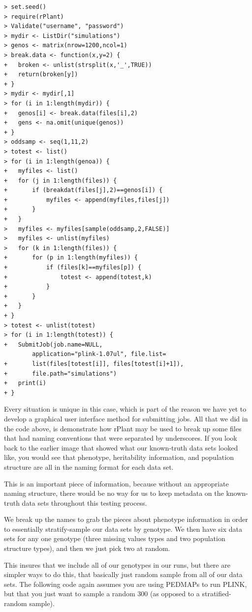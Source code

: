 \documentclass[twoside,a4paper]{refart}
\begin{document}
\begin{center}
\begin{lstlisting}[frame=single]
> set.seed()
> require(rPlant) 
> Validate("username", "password")
> mydir <- ListDir("simulations")
> genos <- matrix(nrow=1200,ncol=1)
> break.data <- function(x,y=2) {
+	broken <- unlist(strsplit(x,'_',TRUE))
+	return(broken[y])
+ }
> mydir <- mydir[,1]
> for (i in 1:length(mydir)) {
+	genos[i] <- break.data(files[i],2) 
+	gens <- na.omit(unique(genos))
+ }
> oddsamp <- seq(1,11,2)
> totest <- list()
> for (i in 1:length(genoa)) {
+	myfiles <- list()
+	for (j in 1:length(files)) {
+		if (breakdat(files[j],2)==genos[i]) {
+			myfiles <- append(myfiles,files[j])
+		}
+	}
>	myfiles <- myfiles[sample(oddsamp,2,FALSE)]
>	myfiles <- unlist(myfiles)
>	for (k in 1:length(files)) {
+		for (p in 1:length(myfiles)) {
+			if (files[k]==myfiles[p]) {
+				totest <- append(totest,k)
+			}
+		}
+	}
+ }
> totest <- unlist(totest)
> for (i in 1:length(totest)) {
+	SubmitJob(job.name=NULL, 
		application="plink-1.07ul", file.list=
+		list(files[totest[i]], files[totest[i]+1]), 
+		file.path="simulations")
+	print(i)
+ }
\end{lstlisting}
\end{center}

Every situation is unique in this case, which is part of the reason we have yet to develop a graphical user interface method for submitting jobs. All that we did in the code above, is demonstrate how rPlant may be used to break up some files that had naming conventions that were separated by underscores. If you look back to the earlier image that showed what our known-truth data sets looked like, you would see that phenotype, heritability information, and population structure are all in the naming format for each data set. 

This is an important piece of information, because without an appropriate naming structure, there would be no way for us to keep metadata on the known-truth data sets throughout this testing process.

We break up the names to grab the pieces about phenotype information in order to essentially stratify-sample our data sets by genotype. We then have six data sets for any one genotype (three missing values types and two population structure types), and then we just pick two at random. 

This insures that we include all of our genotypes in our runs, but there are simpler ways to do this, that basically just random sample from all of our data sets. The following code again assumes you are using PEDMAPs to run PLINK, but that you just want to sample a random 300 (as opposed to a stratified-random sample). 
\end{document}
